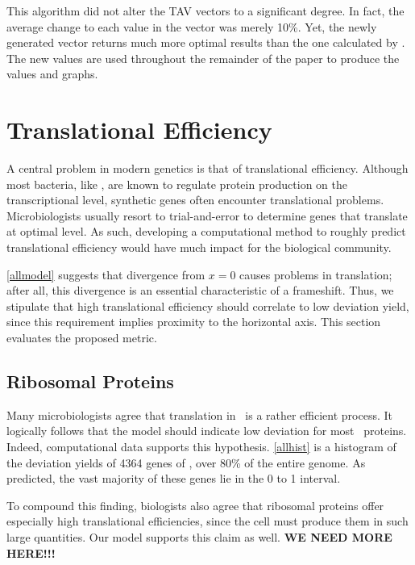 \documentclass[12pt, draft]{article}
\numberwithin{equation}{section}
\begin{document}
This algorithm did not alter the TAV vectors to a significant degree.
In fact, the average change to each value in the vector was merely
10\%.  Yet, the newly generated vector returns much more optimal
results than the one calculated by \citeauthor{lalit:embs}.  The new values
are used throughout the remainder of the paper to produce the 
values and graphs.

\section{Translational Efficiency}


A central problem in modern genetics is that of translational efficiency.
Although most bacteria, like \ecoli, are known to regulate protein production
on the transcriptional level, synthetic genes often encounter translational
problems.  Microbiologists usually resort to trial-and-error to determine genes
that translate at optimal level.  As such, developing a computational method
to roughly predict translational efficiency would have much impact for the 
biological community.

\autoref{allmodel} suggests that divergence from $x=0$ causes
problems in translation; after all, this divergence is an essential characteristic
of a frameshift.  Thus, we stipulate that high translational efficiency should correlate to low deviation yield,
since this requirement implies proximity to the horizontal axis.  This section
evaluates the proposed metric.

\subsection{Ribosomal Proteins}


Many microbiologists agree that translation in \ecoli\ is a rather efficient
process.  It logically follows that the model should indicate low deviation
for most \ecoli\ proteins.  Indeed, computational data supports this hypothesis.
\autoref{allhist} is a histogram of the deviation yields of 4364 genes of
\ecoli, over 80\% of the entire genome.  As predicted, the vast majority
of these genes lie in the 0 to 1 interval.

To compound this finding, biologists also agree that ribosomal proteins
offer especially high translational efficiencies, since the cell must produce
them in such large quantities.  Our model supports this claim as well.
{\textbf{WE NEED MORE HERE!!!}}
\end{document}
